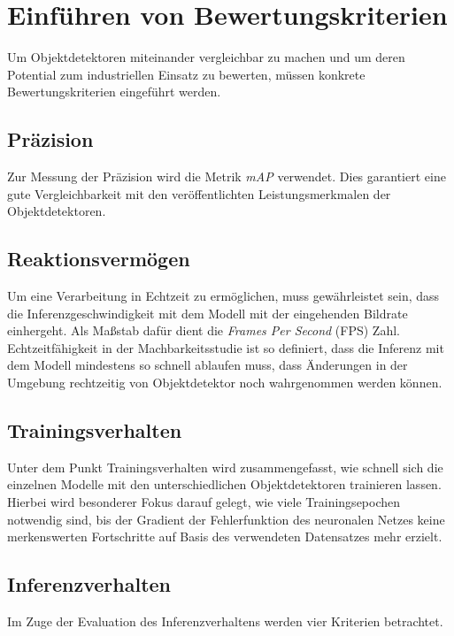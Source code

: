 \section{Einführen von Bewertungskriterien} \label{eval}

Um Objektdetektoren miteinander vergleichbar zu machen und um deren Potential zum industriellen Einsatz zu bewerten, müssen konkrete Bewertungskriterien eingeführt werden.

\subsection*{Präzision}

Zur Messung der Präzision wird die Metrik \textit{mAP} verwendet. Dies garantiert eine gute Vergleichbarkeit mit den veröffentlichten Leistungsmerkmalen der Objektdetektoren.

\subsection*{Reaktionsvermögen}

Um eine Verarbeitung in Echtzeit zu ermöglichen, muss gewährleistet sein, dass die Inferenzgeschwindigkeit mit dem Modell mit der eingehenden Bildrate einhergeht. Als Maßstab dafür dient die \textit{Frames Per Second} (FPS) Zahl. Echtzeitfähigkeit in der Machbarkeitsstudie ist so definiert, dass die Inferenz mit dem Modell mindestens so schnell ablaufen muss, dass Änderungen in der Umgebung rechtzeitig von Objektdetektor noch wahrgenommen werden können. 

\subsection*{Trainingsverhalten}

Unter dem Punkt Trainingsverhalten wird zusammengefasst, wie schnell sich die einzelnen Modelle mit den unterschiedlichen Objektdetektoren trainieren lassen. Hierbei wird besonderer Fokus darauf gelegt, wie viele Trainingsepochen notwendig sind, bis der Gradient der Fehlerfunktion des neuronalen Netzes keine merkenswerten Fortschritte auf Basis des verwendeten Datensatzes mehr erzielt.

\subsection*{Inferenzverhalten}

Im Zuge der Evaluation des Inferenzverhaltens werden vier Kriterien betrachtet. 

